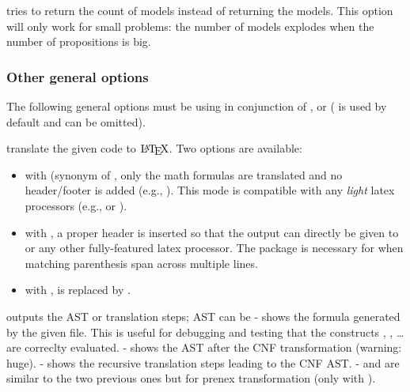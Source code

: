 \textbf{} tries to return the count of models instead of
returning the models. This option will only work for small problems: the
number of models explodes when the number of propositions is big.%

\subsubsection{Other general options}\label{usage-general-options}%

\noindent The following general options must be using in conjunction of 
,  or  ( is used by default and can be omitted).%

\textbf{} translate the given \touist code to $\mbox{\LaTeX}$. Two
options are available:%

\begin{itemize}[noitemsep,topsep=\mdcompacttopsep]%

\item with  (synonym of , only the math formulas
are translated and no header/footer is added (e.g.,
). This mode is compatible with any
\emph{light} latex processors (e.g.,  or ).%

\item with , a proper header is inserted so that the output can
directly be given to  or any other fully-featured latex
processor. The  package is necessary for
 when matching parenthesis span
across multiple lines.%

\item with ,  is replaced by
.%
\end{itemize}%

\noindent\textbf{} outputs the AST or translation steps; AST can be
-  shows the formula generated by the given \touist file. This
   is useful for debugging and testing that the constructs ,
   , \dots{} are correclty evaluated.
-  shows the AST after the CNF transformation (warning: huge).
-  shows the recursive translation steps leading to the
   CNF AST.
-  and  are similar to the two previous ones
   but for prenex transformation (only with ).%

